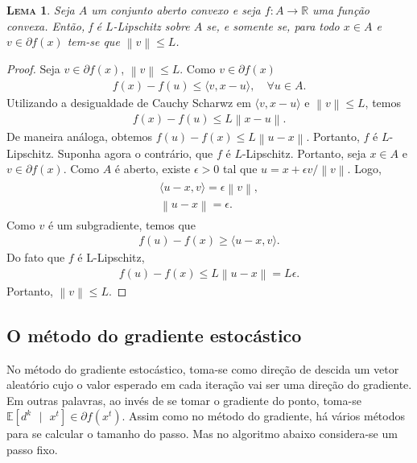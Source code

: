 \documentclass[
	12pt,				%
    oneside,			%
	a4paper,			%
	english,			%
	french,				%
	spanish,			%
	brazil,				%
	]{abntex2}
\newtheorem{lema}[theorem]{\scshape Lema}
\newcommand{\norm}[1]{\left\lVert#1\right\rVert}
\begin{document}
            \begin{lema}
            \label{lema:boundgdsgd}
                Seja $A$ um conjunto aberto convexo e seja $f: A \to \mathbb{R}$ uma função convexa. Então, f é $L$-Lipschitz sobre $A$ se, e somente se, para todo $x \in A$ e $v \in \partial f(x)$ tem-se que $\norm{v} \leq L$.
            \end{lema}
            \begin{proof}
                Seja $v \in \partial f(x)$, $\norm{v} \leq L$. Como $v\in \partial f(x)$
                \begin{gather*}
                    f(x) - f(u) \leq \langle v,x-u \rangle, \quad \forall u \in A.
                \end{gather*}
                Utilizando a desigualdade de Cauchy Scharwz em $\langle v,x-u \rangle$ e $\norm{v} \leq L$, temos
                \begin{gather*}
                    f(x) - f(u) \leq L\norm{x-u}.
                \end{gather*}
                De maneira análoga, obtemos $f(u) - f(x) \leq L\norm{u-x}$.
                Portanto, $f$ é $L$-Lipschitz.
                Suponha agora o contrário, que $f$ é $L$-Lipschitz. Portanto, seja $x\in A$ e $v \in \partial f(x)$. Como $A$ é aberto, existe $\epsilon > 0$ tal que $u = x + \epsilon v/\norm{v}$. Logo,
                \begin{gather*}
                    \begin{split}
                        \langle u-x, v \rangle = \epsilon \norm{v},\\
                        \norm{u-x} = \epsilon.
                    \end{split}
                \end{gather*}
                Como $v$ é um subgradiente, temos que
                \begin{gather*}
                    f(u) - f(x) \geq \langle u-x, v \rangle.
                \end{gather*}
                Do fato que $f$ é L-Lipschitz,
                \begin{gather*}
                    f(u) - f(x) \leq L\norm{u-x} = L\epsilon.
                \end{gather*}
                Portanto, $\norm{v} \leq L$.
            \end{proof}

        \subsection{O método do gradiente estocástico}
            No método do gradiente estocástico, toma-se como direção de descida um vetor aleatório cujo o valor esperado em cada iteração vai ser uma direção do gradiente. Em outras palavras, ao invés de se tomar o gradiente do ponto, toma-se $\mathbb{E}[d^k\mbox{ }\vert\mbox{ } x^t] \in \partial f(x^t)$.
            Assim como no método do gradiente, há vários métodos para se calcular o tamanho do passo. Mas no algoritmo abaixo considera-se um passo fixo.
\end{document}
